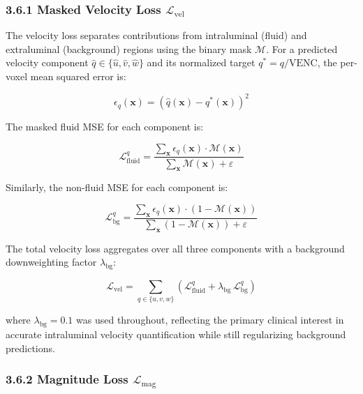 \subsubsection*{3.6.1 Masked Velocity Loss $\mathcal{L}_{\text{vel}}$}

The velocity loss separates contributions from intraluminal (fluid) and extraluminal (background) regions using the binary mask $\mathcal{M}$. For a predicted velocity component $\hat{q} \in \{\hat{u}, \hat{v}, \hat{w}\}$ and its normalized target $q^* = q / \text{VENC}$, the per-voxel mean squared error is:

\begin{equation}
    \epsilon_q(\mathbf{x}) = \left(\hat{q}(\mathbf{x}) - q^*(\mathbf{x})\right)^2
\end{equation}

The masked fluid MSE for each component is:

\begin{equation}
    \mathcal{L}^q_{\text{fluid}} = \frac{\sum_{\mathbf{x}} \epsilon_q(\mathbf{x}) \cdot \mathcal{M}(\mathbf{x})}{\sum_{\mathbf{x}} \mathcal{M}(\mathbf{x}) + \varepsilon}
\end{equation}

Similarly, the non-fluid MSE for each component is:

\begin{equation}
    \mathcal{L}^q_{\text{bg}} = \frac{\sum_{\mathbf{x}} \epsilon_q(\mathbf{x}) \cdot (1 - \mathcal{M}(\mathbf{x}))}{\sum_{\mathbf{x}} (1 - \mathcal{M}(\mathbf{x})) + \varepsilon}
\end{equation}

The total velocity loss aggregates over all three components with a background downweighting factor $\lambda_{\text{bg}}$:

\begin{equation}
    \mathcal{L}_{\text{vel}} = \sum_{q \in \{u,v,w\}} \left( \mathcal{L}^q_{\text{fluid}} + \lambda_{\text{bg}} \, \mathcal{L}^q_{\text{bg}} \right)
\end{equation}

where $\lambda_{\text{bg}} = 0.1$ was used throughout, reflecting the primary clinical interest in accurate intraluminal velocity quantification while still regularizing background predictions.

\subsubsection*{3.6.2 Magnitude Loss $\mathcal{L}_{\text{mag}}$}


